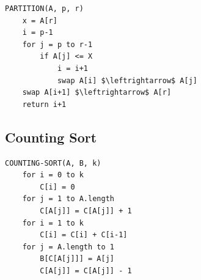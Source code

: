\documentclass[10pt,a4paper]{article}
\begin{document}
\begin{multicols*}{2}
\begin{lstlisting}
PARTITION(A, p, r)
    x = A[r]
    i = p-1
    for j = p to r-1
        if A[j] <= X
            i = i+1
            swap A[i] $\leftrightarrow$ A[j]
    swap A[i+1] $\leftrightarrow$ A[r]
    return i+1
\end{lstlisting}
\subsection*{Counting Sort}
\begin{lstlisting}
COUNTING-SORT(A, B, k)
    for i = 0 to k
        C[i] = 0
    for j = 1 to A.length
        C[A[j]] = C[A[j]] + 1
    for i = 1 to k
        C[i] = C[i] + C[i-1]
    for j = A.length to 1
        B[C[A[j]]] = A[j]
        C[A[j]] = C[A[j]] - 1
\end{lstlisting}
\end{multicols*}

\pagebreak
\end{document}
